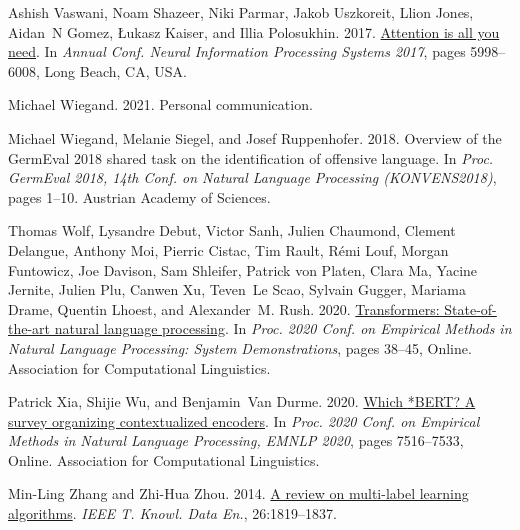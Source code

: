 \documentclass[11pt,a4paper]{article}
\begin{document}
\begin{thebibliography}{25}
    Ashish Vaswani, Noam Shazeer, Niki Parmar, Jakob Uszkoreit, Llion Jones,
      Aidan~N Gomez, {\L}ukasz Kaiser, and Illia Polosukhin. 2017.
    \newblock \href {http://arxiv.org/abs/1706.03762} {Attention is all you need}.
    \newblock In \emph{Annual Conf. Neural Information Processing Systems 2017},
      pages 5998--6008, Long Beach, CA, USA.
    
    Michael Wiegand. 2021.
    \newblock Personal communication.
    
    Michael Wiegand, Melanie Siegel, and Josef Ruppenhofer. 2018.
    \newblock Overview of the {G}erm{E}val 2018 shared task on the identification
      of offensive language.
    \newblock In \emph{Proc. {G}erm{E}val 2018, 14th Conf. on Natural Language
      Processing (KONVENS2018)}, pages 1--10. Austrian Academy of Sciences.
    
    Thomas Wolf, Lysandre Debut, Victor Sanh, Julien Chaumond, Clement Delangue,
      Anthony Moi, Pierric Cistac, Tim Rault, Rémi Louf, Morgan Funtowicz, Joe
      Davison, Sam Shleifer, Patrick von Platen, Clara Ma, Yacine Jernite, Julien
      Plu, Canwen Xu, Teven~Le Scao, Sylvain Gugger, Mariama Drame, Quentin Lhoest,
      and Alexander~M. Rush. 2020.
    \newblock \href {https://www.aclweb.org/anthology/2020.emnlp-demos.6}
      {Transformers: State-of-the-art natural language processing}.
    \newblock In \emph{Proc. 2020 Conf. on Empirical Methods in Natural Language
      Processing: System Demonstrations}, pages 38--45, Online. Association for
      Computational Linguistics.
    
    Patrick Xia, Shijie Wu, and Benjamin~Van Durme. 2020.
    \newblock \href {https://doi.org/10.18653/v1/2020.emnlp-main.608} {Which
      {*BERT}? {A} survey organizing contextualized encoders}.
    \newblock In \emph{Proc. 2020 Conf. on Empirical Methods in Natural Language
      Processing, {EMNLP} 2020}, pages 7516--7533, Online. Association for
      Computational Linguistics.
    
    Min-Ling Zhang and Zhi-Hua Zhou. 2014.
    \newblock \href {https://doi.org/10.1109/tkde.2013.39} {A review on multi-label
      learning algorithms}.
    \newblock \emph{{IEEE} {T}. Knowl. Data En.}, 26:1819--1837.
    

\end{thebibliography}
\end{document}
